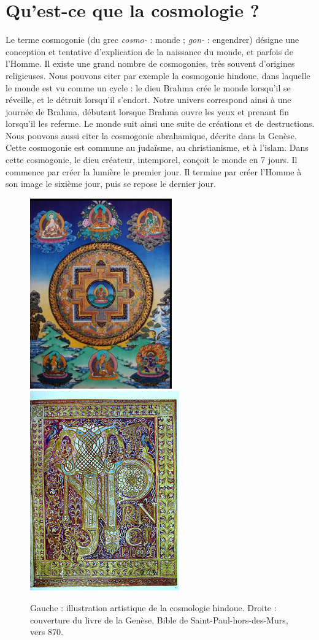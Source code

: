 \section{Qu'est-ce que la cosmologie ?}
Le terme cosmogonie (du grec \emph{cosmo-} : monde ; \emph{gon-} : engendrer) désigne une conception et tentative d'explication de la naissance du monde, et parfois de l'Homme. Il existe une grand nombre de cosmogonies, très souvent d'origines religieuses. Nous pouvons citer par exemple la cosmogonie hindoue, dans laquelle le monde est vu comme un cycle : le dieu Brahma crée le monde lorsqu'il se réveille, et le détruit lorsqu'il s'endort. Notre univers correspond ainsi à une journée de Brahma, débutant lorsque Brahma ouvre les yeux et prenant fin lorsqu'il les referme. Le monde suit ainsi une suite de créations et de destructions.
Nous pouvons aussi citer la cosmogonie abrahamique, décrite dans la Genèse. Cette cosmogonie est commune au judaïsme, au christianisme, et à l'islam. Dans cette cosmogonie, le dieu créateur, intemporel, conçoit le monde en 7 jours. Il commence par créer la lumière le premier jour. Il termine par créer l'Homme à son image le sixième jour, puis se repose le dernier jour.
\begin{figure}
  \centering
  \includegraphics[scale=1]{cosmohindoue.png}
  \hspace{3cm}
  \includegraphics[scale=1]{genese.png}
  \caption{Gauche : illustration artistique de la cosmologie hindoue. Droite : couverture du livre de la Genèse, Bible de Saint-Paul-hors-des-Murs, vers 870.}
  \label{fig:cosmohindoue}
\end{figure}

